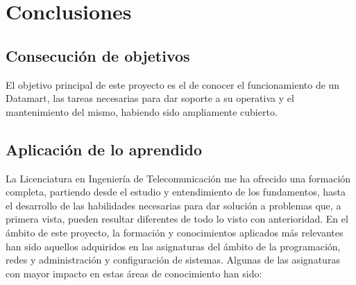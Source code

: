 \documentclass[a4paper, 12pt]{book}
\begin{document}

\cleardoublepage
\chapter{Conclusiones}
\label{chap:conclusiones}

\section{Consecución de objetivos}
\label{sec:consecucion-objetivos}

El objetivo principal de este proyecto es el de conocer el funcionamiento de un Datamart, las tareas necesarias para dar soporte a su operativa y el mantenimiento del mismo, habiendo sido ampliamente cubierto.


\section{Aplicación de lo aprendido}
\label{sec:aplicacion}

La Licenciatura en Ingeniería de Telecomunicación me ha ofrecido una formación completa, partiendo desde el estudio y entendimiento de los fundamentos, hasta el desarrollo de las habilidades necesarias para dar solución a problemas que, a primera vista, pueden resultar diferentes de todo lo visto con anterioridad. En el ámbito de este proyecto, la formación y conocimientos aplicados más relevantes han sido aquellos adquiridos en las asignaturas del ámbito de la programación, redes y administración y configuración de sistemas. Algunas de las asignaturas con mayor impacto en estas áreas de conocimiento han sido:
\end{document}
